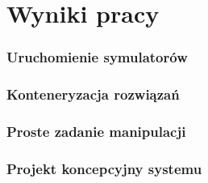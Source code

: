 \section{Wyniki pracy}


\begin{frame}
    \frametitle{Uruchomienie symulatorów}
\end{frame}


\begin{frame}
    \frametitle{Konteneryzacja rozwiązań}
\end{frame}


\begin{frame}
    \frametitle{Proste zadanie manipulacji}
\end{frame}


\begin{frame}
	\frametitle{Projekt koncepcyjny systemu}
\end{frame}

